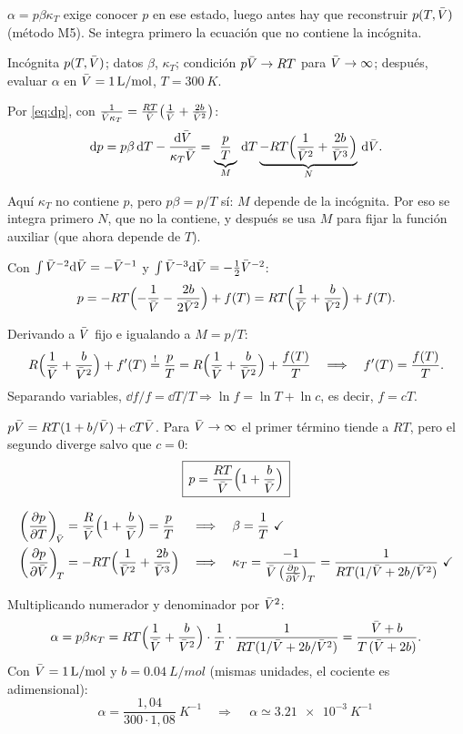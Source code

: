 \begin{resolucion}
\idea $\alpha=p\beta\kappa_T$ exige conocer $p$ en ese estado, luego antes hay que reconstruir
$p(T,\bar{V})$ (método M5). Se integra primero la ecuación que no contiene la incógnita.

 Incógnita $p(T,\bar{V})$; datos $\beta$, $\kappa_T$; condición $p\bar{V}\to RT$ para
$\bar{V}\to\infty$; después, evaluar $\alpha$ en $\bar{V}=\SI{1}{L/mol}$, $T=\SI{300}{K}$.

 Por \eqref{eq:dp}, con
$\frac{1}{\bar{V}\kappa_T}=\frac{RT}{\bar{V}}\bigl(\frac1{\bar{V}}+\frac{2b}{\bar{V}^2}\bigr)$:
\[
  \mathrm{d} p=p\beta\,\mathrm{d} T-\frac{\mathrm{d}\bar{V}}{\kappa_T\bar{V}}
  =\underbrace{\frac pT}_{M}\,\mathrm{d} T\underbrace{-RT\Bigl(\frac{1}{\bar{V}^2}+\frac{2b}{\bar{V}^3}\Bigr)}_{N}\,\mathrm{d}\bar{V}.
\]

 Aquí $\kappa_T$ no contiene $p$, pero $p\beta=p/T$ sí:
$M$ depende de la incógnita. Por eso se integra primero $N$, que no la contiene, y después se usa
$M$ para fijar la función auxiliar (que ahora depende de $T$).

 Con
$\int\bar{V}^{-2}\mathrm{d}\bar{V}=-\bar{V}^{-1}$ y $\int\bar{V}^{-3}\mathrm{d}\bar{V}=-\tfrac12\bar{V}^{-2}$:
\[
  p=-RT\Bigl(-\frac1{\bar{V}}-\frac{2b}{2\bar{V}^2}\Bigr)+f(T)=RT\Bigl(\frac1{\bar{V}}+\frac{b}{\bar{V}^2}\Bigr)+f(T).
\]

 Derivando a $\bar{V}$ fijo e igualando a $M=p/T$:
\[
  R\Bigl(\frac1{\bar{V}}+\frac b{\bar{V}^2}\Bigr)+f'(T)\stackrel{!}{=}\frac pT=R\Bigl(\frac1{\bar{V}}+\frac b{\bar{V}^2}\Bigr)+\frac{f(T)}{T}
  \quad\Longrightarrow\quad f'(T)=\frac{f(T)}{T}.
\]
Separando variables, $\dd f/f=\dd T/T\Rightarrow\ln f=\ln T+\ln c$, es decir, $f=cT$.

 $p\bar{V}=RT(1+b/\bar{V})+cT\bar{V}$. Para $\bar{V}\to\infty$ el primer término tiende a $RT$,
pero el segundo diverge salvo que $c=0$:
\[
  \boxed{\,p=\frac{RT}{\bar{V}}\Bigl(1+\frac{b}{\bar{V}}\Bigr)\,}
\]

\begin{align*}
  \left(\frac{\partial p}{\partial T}\right)_{\!\bar{V}}&=\frac R{\bar{V}}\Bigl(1+\frac b{\bar{V}}\Bigr)=\frac pT &&\Longrightarrow\quad \beta=\frac1T\ \checkmark\\
  \left(\frac{\partial p}{\partial \bar{V}}\right)_{\!T}&=-RT\Bigl(\frac1{\bar{V}^2}+\frac{2b}{\bar{V}^3}\Bigr) &&\Longrightarrow\quad
  \kappa_T=\frac{-1}{\bar{V}\,\bigl(\tfrac{\partial p}{\partial \bar{V}}\bigr)_{T}}=\frac{1}{RT(1/\bar{V}+2b/\bar{V}^2)}\ \checkmark
\end{align*}

 Multiplicando numerador y denominador por $\bar{V}^2$:
\[
  \alpha=p\beta\kappa_T=RT\Bigl(\frac1{\bar{V}}+\frac b{\bar{V}^2}\Bigr)\cdot\frac1T\cdot\frac{1}{RT(1/\bar{V}+2b/\bar{V}^2)}
  =\frac{\bar{V}+b}{T\,(\bar{V}+2b)}.
\]
Con $\bar{V}=\SI{1}{L/mol}$ y $b=\SI{0,04}{L/mol}$ (mismas unidades, el cociente es adimensional):
\[
  \alpha=\frac{1{,}04}{300\cdot1{,}08}\ \si{K^{-1}}\quad\Longrightarrow\quad\boxed{\,\alpha\simeq\SI{3,21e-3}{K^{-1}}\,}
\]
\end{resolucion}

